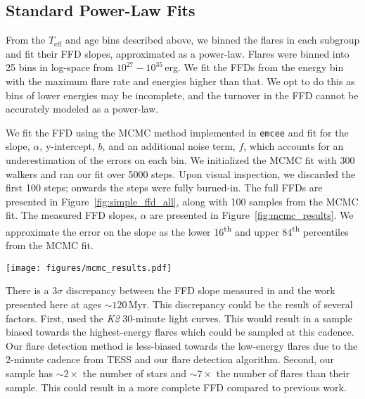 \documentclass[twocolumn]{aastex631}
\begin{document}
\subsection{Standard Power-Law Fits}\label{subsec:stats}

From the $T_\textrm{eff}$ and age bins described above, we binned the flares in each
subgroup and fit their FFD slopes, approximated as a power-law. Flares were binned
into 25 bins in log-space from $10^{27} - 10^{35}$\,erg. We fit the FFDs from the
energy bin with the maximum flare rate and energies higher than that. We opt to do
this as bins of lower energies may be incomplete, and the turnover in the FFD cannot
be accurately modeled as a power-law.

We fit the FFD using the MCMC method implemented in \texttt{emcee} \citep{goodman10, emcee}
and fit for the slope, $\alpha$, y-intercept, $b$, and an additional noise term, $f$, which
accounts for an underestimation of the errors on each bin. We initialized the MCMC fit with
300 walkers and ran our fit over 5000 steps. Upon visual inspection, we discarded the
first 100 steps; onwards the steps were fully burned-in. The full FFDs are presented
in Figure~\ref{fig:simple_ffd_all}, along with 100 samples from the MCMC fit. The measured
FFD slopes, $\alpha$ are presented in Figure~\ref{fig:mcmc_results}. We approximate the
error on the slope as the lower 16\textsuperscript{th} and upper 84\textsuperscript{th}
percentiles from the MCMC fit.


\begin{figure*}[ht!]
    \begin{centering}
        \texttt{[image: figures/mcmc\_results.pdf]}
        \caption{
            Measured flare-frequency distribution slopes, $\alpha$, as a function
            of stellar effective temperature, $T_\textrm{eff}$ and age.
        }
        \label{fig:mcmc_results}
    \end{centering}
\end{figure*}

There is a $3\sigma$ discrepancy between the FFD slope measured in \cite{ilin21}
and the work presented here at ages $\sim 120$\,Myr. This discrepancy could be the
result of several factors. First, \cite{ilin21} used the \textit{K2} 30-minute
light curves. This would result in a sample biased towards the highest-energy flares which
could be sampled at this cadence. Our flare detection method is less-biased towards
the low-energy flares due to the 2-minute cadence from TESS and our flare detection
algorithm. Second, our sample has $\sim 2\times$ the number
of stars and $\sim 7\times$ the number of flares than their sample. This could
result in a more complete FFD compared to previous work.
\end{document}
